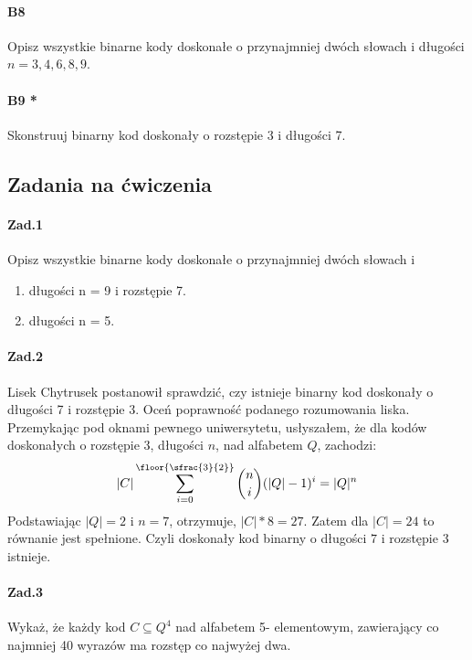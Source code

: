\paragraph{B8} Opisz wszystkie binarne kody doskonałe o przynajmniej dwóch słowach i długości $n = 3, 4, 6, 8, 9$.

\paragraph{B9 *} Skonstruuj binarny kod doskonały o rozstępie 3 i długości 7.

\subsection{Zadania na ćwiczenia}
\paragraph{Zad.1} Opisz wszystkie binarne kody doskonałe o przynajmniej dwóch słowach i
\begin{enumerate}[label=\alph*)]
\item długości n = 9 i rozstępie 7.
\item długości n = 5.
\end{enumerate}


\paragraph{Zad.2} Lisek Chytrusek postanowił sprawdzić, czy istnieje binarny kod doskonały o długości 7 i rozstępie 3. Oceń poprawność podanego rozumowania liska. Przemykając pod oknami pewnego uniwersytetu, usłyszałem, że dla kodów doskonałych o rozstępie 3, długości $n$, nad alfabetem $Q$, zachodzi: $$|C| \sum ^{\floor{\sfrac{3}{2}}}_{i=0}\binom{n}{i}(|Q| - 1)^i = |Q|^n$$Podstawiając $|Q| = 2$ i $n = 7$, otrzymuje, $|C|* 8 = 27$. Zatem dla $|C| = 24$ to równanie jest spełnione. Czyli doskonały kod binarny o długości $7$ i rozstępie $3$ istnieje.

\paragraph{Zad.3} Wykaż, że każdy kod $C \subseteq Q^4$ nad alfabetem 5- elementowym, zawierający co najmniej 40 wyrazów ma rozstęp co najwyżej dwa.

